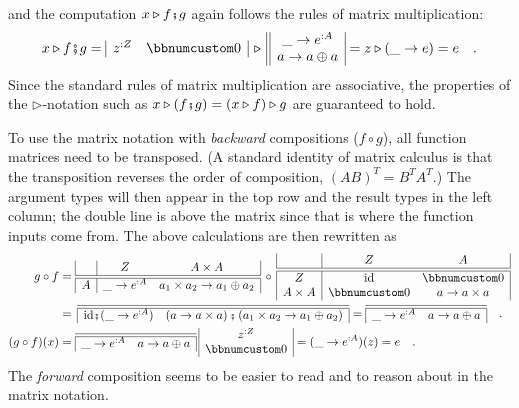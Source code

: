 and the computation $x\triangleright f\bef g$ again follows the rules
of matrix multiplication:
\[
x\triangleright f\bef g=\begin{array}{|cc|}
z^{:Z} & \bbnum 0\end{array}\,\triangleright\,\begin{array}{||c|}
\_\rightarrow e^{:A}\\
a\rightarrow a\oplus a
\end{array}=z\triangleright(\_\rightarrow e)=e\quad.
\]
Since the standard rules of matrix multiplication are associative,
the properties of the $\triangleright$-notation such as $x\triangleright(f\bef g)=(x\triangleright f)\triangleright g$
are guaranteed to hold.

To use the matrix notation with \emph{backward} compositions ($f\circ g$),
all function matrices need to be transposed. (A standard identity
of matrix calculus is that the transposition reverses the order of
composition, $\left(AB\right)^{T}=B^{T}A^{T}$.) The argument types
will then appear in the top row and the result types in the left column;
the double line is above the matrix since that is where the function
inputs come from. The above calculations are then rewritten as
\begin{align*}
g\circ f & =\begin{array}{|c|cc|}
 & Z & A\times A\\
\hline\hline A & \_\rightarrow e^{:A} & a_{1}\times a_{2}\rightarrow a_{1}\oplus a_{2}
\end{array}\,\circ\,\begin{array}{|c|cc|}
 & Z & A\\
\hline\hline Z & \text{id} & \bbnum 0\\
A\times A & \bbnum 0 & a\rightarrow a\times a
\end{array}\\
 & =\,\begin{array}{|cc|}
\hline\hline \text{id}\bef(\_\rightarrow e^{:A}) & \left(a\rightarrow a\times a\right)\bef\left(a_{1}\times a_{2}\rightarrow a_{1}\oplus a_{2}\right)\end{array}=\begin{array}{|cc|}
\hline\hline \_\rightarrow e^{:A} & a\rightarrow a\oplus a\end{array}\quad.\\
(g\circ f)(x) & =\begin{array}{|cc|}
\hline\hline \_\rightarrow e^{:A} & a\rightarrow a\oplus a\end{array}\,\begin{array}{|c|}
z^{:Z}\\
\bbnum 0
\end{array}=(\_\rightarrow e^{:A})(z)=e\quad.
\end{align*}
The \emph{forward} composition seems to be easier to read and to reason
about in the matrix notation.

